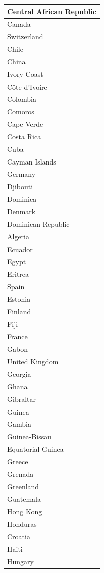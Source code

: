 \documentclass[]{article}
\begin{document}
\begin{table}
\begin{tabular}[t]{l}
\hline
Central African Republic\\
\hline
Canada\\
\hline
Switzerland\\
\hline
Chile\\
\hline
China\\
\hline
Ivory Coast\\
\hline
Côte d'Ivoire\\
\hline
Colombia\\
\hline
Comoros\\
\hline
Cape Verde\\
\hline
Costa Rica\\
\hline
Cuba\\
\hline
Cayman Islands\\
\hline
Germany\\
\hline
Djibouti\\
\hline
Dominica\\
\hline
Denmark\\
\hline
Dominican Republic\\
\hline
Algeria\\
\hline
Ecuador\\
\hline
Egypt\\
\hline
Eritrea\\
\hline
Spain\\
\hline
Estonia\\
\hline
Finland\\
\hline
Fiji\\
\hline
France\\
\hline
Gabon\\
\hline
United Kingdom\\
\hline
Georgia\\
\hline
Ghana\\
\hline
Gibraltar\\
\hline
Guinea\\
\hline
Gambia\\
\hline
Guinea-Bissau\\
\hline
Equatorial Guinea\\
\hline
Greece\\
\hline
Grenada\\
\hline
Greenland\\
\hline
Guatemala\\
\hline
Hong Kong\\
\hline
Honduras\\
\hline
Croatia\\
\hline
Haiti\\
\hline
Hungary\\

\end{tabular}
\end{table}
\end{document}
